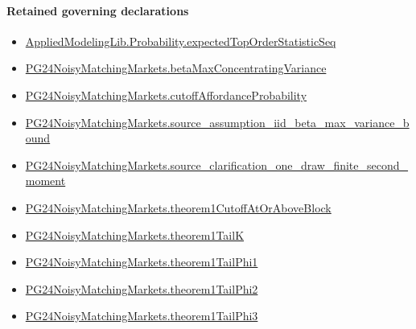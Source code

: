 \documentclass[10pt]{article}
\begin{document}
\paragraph{Retained governing declarations}
\begin{itemize}\raggedright
\item \hyperlink{governing-declaration-0b73f814382be426}{Applied\allowbreak{}Modeling\allowbreak{}Lib.\allowbreak{}Probability.\allowbreak{}expected\allowbreak{}Top\allowbreak{}Order\allowbreak{}Statistic\allowbreak{}Seq}
\item \hyperlink{governing-declaration-322e8322d17fd70c}{PG24\allowbreak{}Noisy\allowbreak{}Matching\allowbreak{}Markets.\allowbreak{}beta\allowbreak{}Max\allowbreak{}Concentrating\allowbreak{}Variance}
\item \hyperlink{governing-declaration-a4a2a08d89f647e4}{PG24\allowbreak{}Noisy\allowbreak{}Matching\allowbreak{}Markets.\allowbreak{}cutoff\allowbreak{}Affordance\allowbreak{}Probability}
\item \hyperlink{governing-declaration-106a735d10bd3342}{PG24\allowbreak{}Noisy\allowbreak{}Matching\allowbreak{}Markets.\allowbreak{}source\_\allowbreak{}assumption\_\allowbreak{}iid\_\allowbreak{}beta\_\allowbreak{}max\_\allowbreak{}variance\_\allowbreak{}bound}
\item \hyperlink{governing-declaration-046b66910b6038e5}{PG24\allowbreak{}Noisy\allowbreak{}Matching\allowbreak{}Markets.\allowbreak{}source\_\allowbreak{}clarification\_\allowbreak{}one\_\allowbreak{}draw\_\allowbreak{}finite\_\allowbreak{}second\_\allowbreak{}moment}
\item \hyperlink{governing-declaration-3c7a8399566177d2}{PG24\allowbreak{}Noisy\allowbreak{}Matching\allowbreak{}Markets.\allowbreak{}theorem1\allowbreak{}Cutoff\allowbreak{}At\allowbreak{}Or\allowbreak{}Above\allowbreak{}Block}
\item \hyperlink{governing-declaration-293a20a9c7b67aee}{PG24\allowbreak{}Noisy\allowbreak{}Matching\allowbreak{}Markets.\allowbreak{}theorem1\allowbreak{}Tail\allowbreak{}K}
\item \hyperlink{governing-declaration-296c254211118e37}{PG24\allowbreak{}Noisy\allowbreak{}Matching\allowbreak{}Markets.\allowbreak{}theorem1\allowbreak{}Tail\allowbreak{}Phi1}
\item \hyperlink{governing-declaration-7a36399b03a33917}{PG24\allowbreak{}Noisy\allowbreak{}Matching\allowbreak{}Markets.\allowbreak{}theorem1\allowbreak{}Tail\allowbreak{}Phi2}
\item \hyperlink{governing-declaration-f214e532deafeb52}{PG24\allowbreak{}Noisy\allowbreak{}Matching\allowbreak{}Markets.\allowbreak{}theorem1\allowbreak{}Tail\allowbreak{}Phi3}

\end{itemize}
\end{document}
